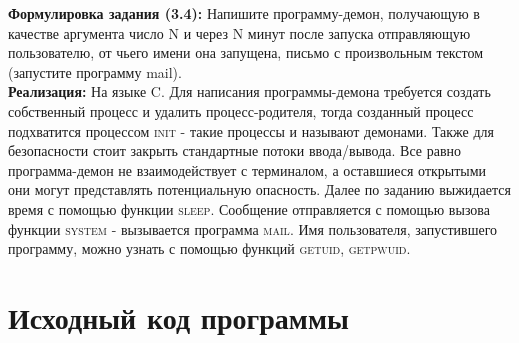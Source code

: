 





\pagebreak

\textbf{Формулировка задания (3.4):} Напишите программу-демон, получающую в качестве аргумента число N и через N минут после
запуска отправляющую пользователю, от чьего имени она запущена, письмо с произвольным текстом (запустите программу mail). \\

\textbf{Реализация:} На языке \textsc{C}. Для написания программы-демона требуется создать собственный процесс и удалить процесс-родителя, тогда созданный процесс подхватится процессом \textsc{init} - такие процессы и называют демонами. Также для безопасности стоит закрыть
стандартные потоки ввода/вывода. Все равно программа-демон не взаимодействует с терминалом, а оставшиеся открытыми они могут представлять потенциальную опасность. Далее по заданию выжидается время с помощью функции \textsc{sleep}. Сообщение отправляется с помощью вызова функции \textsc{system} - вызывается программа \textsc{mail}. Имя пользователя, запустившего программу, можно узнать с помощью функций \textsc{getuid, getpwuid}.


\section*{Исходный код программы}
\lstset{language=c, caption=Simple daemon program example source, %
label=source-code, basicstyle=\footnotesize,%
numbers=left, numberstyle=\footnotesize, numbersep=5pt, frame=single, breaklines=true, breakatwhitespace=false,%
inputencoding=utf8x}





